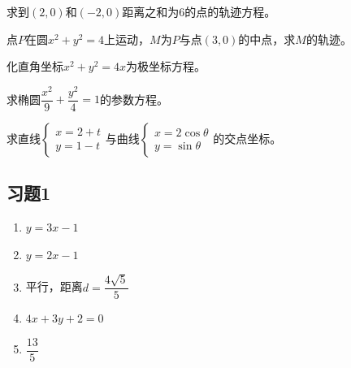 \documentclass[a4paper,12pt]{ctexart}
\begin{document}


\begin{exercise}
\item 求到$(2,0)$和$(-2,0)$距离之和为$6$的点的轨迹方程。
\item 点$P$在圆$x^2+y^2=4$上运动，$M$为$P$与点$(3,0)$的中点，求$M$的轨迹。
\item 化直角坐标$x^2+y^2=4x$为极坐标方程。
\item 求椭圆$\dfrac{x^2}{9}+\dfrac{y^2}{4}=1$的参数方程。
\item 求直线$\begin{cases}x=2+t\\y=1-t\end{cases}$与曲线$\begin{cases}x=2\cos\theta\\y=\sin\theta\end{cases}$的交点坐标。
\end{exercise}

\newpage
{}

\subsection*{习题1}
\begin{enumerate}
  \item $y=3x-1$
  \item $y=2x-1$
  \item 平行，距离$d=\dfrac{4\sqrt5}{5}$
  \item $4x+3y+2=0$
  \item $\dfrac{13}{5}$
\end{enumerate}
\end{document}
